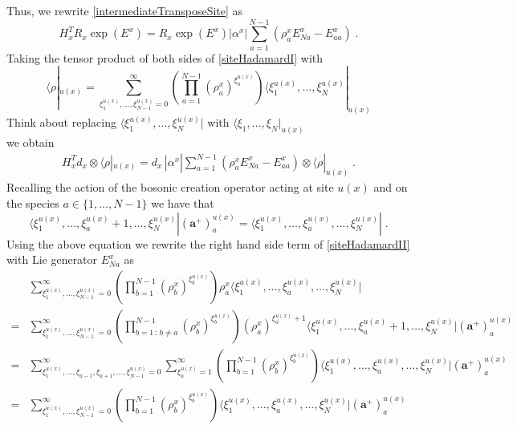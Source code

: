 \documentclass[10pt]{article}
\numberwithin{equation}{section}
\numberwithin{equation}{subsection}
\newcommand{\dt}{\;.}
\begin{document}
Thus, we rewrite \eqref{intermediateTransposeSite} as
\begin{equation}\label{siteHadamardI}
H_{x}^{T}R_{x}\exp{(E^{x})}=R_{x}\exp{(E^{x})}|\alpha^{x}|\sum_{a=1}^{N-1}\left(\rho_{a}^{x}E_{Na}^{x}-E_{aa}^{x}\right)\dt
\end{equation}
Taking the tensor product of both sides of \eqref{siteHadamardI} with 
\begin{equation}
\langle \rho|_{u(x)}=\sum_{\xi_{1}^{u(x)},\ldots,\xi_{N-1}^{u(x)}=0}^{\infty}\left(\prod_{a=1}^{N-1}\left(\rho_{a}^{x}\right)^{\xi_{a}^{u(x)}}\right)\langle \xi_{1}^{u(x)},\ldots,\xi_{N}^{u(x)}|_{u(x)}
\end{equation}
{\color{blue}Think about replacing $\langle \xi_{1}^{u(x)},\ldots,\xi_{N}^{u(x)}|$ with $\langle \xi_{1},\ldots,\xi_{N}|_{u(x)}$}\\
we obtain 
\begin{equation}\label{siteHadamardII}
    \begin{split}
    	H_{x}^{T}d_{x}\otimes\langle\rho|_{u(x)}=
 d_{x}\,
|\alpha^{x}|\sum_{a=1}^{N-1}\left(\rho_{a}^{x}E_{Na}^{x}-E_{aa}^{x}\right)\otimes \langle\rho|_{u(x)}\dt
    \end{split}
\end{equation}
Recalling the action of the bosonic creation operator acting at site $u(x)$ and on the species $a\in \{1,\ldots,N-1\}$ we have that 
\begin{equation}\label{bosonicKX}
    \langle \xi_{1}^{u(x)},\ldots,\xi_{a}^{u(x)}+1,\ldots,\xi_{N}^{u(x)}|(\mathbf{a}^{+})^{u(x)}_{a}=  \langle \xi_{1}^{u(x)},\ldots,\xi_{a}^{u(x)},\ldots,\xi_{N}^{u(x)}|\dt
\end{equation}
Using the above equation we rewrite the right hand side term of \eqref{siteHadamardII} with Lie generator $E_{Na}^{x}$ as 
\begin{equation}\label{extra-site-trick}
    \begin{split}
&\sum_{\xi_{1}^{u(x)},\ldots,\xi_{N-1}^{u(x)}=0}^{\infty}\left(\prod_{b=1}^{N-1}\left(\rho_{b}^{x}\right)^{\xi_{b}^{u(x)}}\right)\rho_{a}^{x}\langle \xi_{1}^{u(x)},\ldots,\xi_{a}^{u(x)},\ldots,\xi_{N}^{u(x)}|
\\=&
\sum_{\xi_{1}^{u(x)},\ldots,\xi_{N-1}^{u(x)}=0}^{\infty}\left(\prod_{b=1\,:\,b\neq a}^{N-1}\left(\rho_{b}^{x}\right)^{\xi_{b}^{u(x)}}\right)\left(\rho_{a}^{x}\right)^{\xi_{a}^{u(x)}+1}\langle \xi_{1}^{u(x)},\ldots,\xi_{a}^{u(x)}+1,\ldots,\xi_{N}^{u(x)}|(\mathbf{a}^{+})_{a}^{u(x)}
\\=&
\sum_{\xi_{1}^{u(x)},\ldots,\xi_{a-1},\xi_{a+1},\ldots,\xi_{N-1}^{u(x)}=0}^{\infty}\sum_{\xi_{a}^{u(x)}=1}^{\infty}\left(\prod_{b=1}^{N-1}\left(\rho_{b}^{x}\right)^{\xi_{b}^{u(x)}}\right)\langle \xi_{1}^{u(x)},\ldots,\xi_{a}^{u(x)},\ldots,\xi_{N}^{u(x)}|(\mathbf{a}^{+})_{a}^{u(x)}\\=&
\sum_{\xi_{1}^{u(x)},\ldots,\xi_{N-1}^{u(x)}=0}^{\infty}\left(\prod_{b=1}^{N-1}\left(\rho_{b}^{x}\right)^{\xi_{b}^{u(x)}}\right)\langle \xi_{1}^{u(x)},\ldots,\xi_{a}^{u(x)},\ldots,\xi_{N}^{u(x)}|(\mathbf{a}^{+})_{a}^{u(x)}
    \end{split}
\end{equation}
\end{document}
